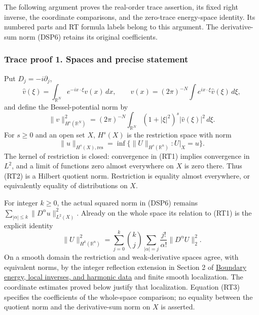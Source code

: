 \documentclass[
  11pt,
]{article}
\makeatletter
\let\ReaderOriginalAnchorStart\hyper@anchorstart
\let\ReaderOriginalAnchorEnd\hyper@anchorend
\let\ReaderPendingAliases\@empty
\def\ReaderArmAliases#1{\gdef\ReaderPendingAliases{#1}}
\def\hyper@anchorstart#1{\ReaderIfNativeAnchorTF{#1}{\ReaderPendingAliases\global\let\ReaderPendingAliases\@empty}{}\ReaderOriginalAnchorStart{#1}}
\makeatother
\begin{document}
The following argument proves the real-order trace assertion, its fixed
right inverse, the coordinate comparisons, and the zero-trace
energy-space identity. Its numbered parts and RT formula labels belong
to this argument. The derivative-sum norm (DSP6) retains its original
coefficients.

\ReaderArmAliases{\ReaderOriginalAnchorStart{trace-proof-1-spaces-and-precise-statement}\ReaderOriginalAnchorEnd\begingroup\expandafter\def\csname @currentHref\endcsname{trace-proof-1-spaces-and-precise-statement}\label{trace-proof-1-spaces-and-precise-statement}\endgroup\ReaderOriginalAnchorStart{trace-proof-1.-spaces-and-precise-statement}\ReaderOriginalAnchorEnd}
\subsubsection{Trace proof 1. Spaces and precise
statement}\label{trace-proof-1.-spaces-and-precise-statement}

Put \(D_j=-i\partial_j\), \[
 \widehat v(\xi)=\int_{\mathbb R^N}e^{-ix\cdot\xi}v(x)\,dx,
 \qquad
 v(x)=(2\pi)^{-N}\int e^{ix\cdot\xi}\widehat v(\xi)\,d\xi,
\] and define the Bessel-potential norm by \[
 \|v\|_{H^s(\mathbb R^N)}^2
 =(2\pi)^{-N}\int_{\mathbb R^N}(1+|\xi|^2)^s|\widehat v(\xi)|^2\,d\xi.
 \tag{RT1}
\] For \(s\geq0\) and an open set \(X\), \(H^s(X)\) is the restriction
space with norm \[
 \|u\|_{H^s(X),\mathrm{res}}
 =\inf\{\|U\|_{H^s(\mathbb R^n)}:U|_X=u\}.
 \tag{RT2}
\] The kernel of restriction is closed: convergence in (RT1) implies
convergence in \(L^2\), and a limit of functions zero almost everywhere
on \(X\) is zero there. Thus (RT2) is a Hilbert quotient norm.
Restriction is equality almost everywhere, or equivalently equality of
distributions on \(X\).

For integer \(k\geq0\), the actual squared norm in (DSP6) remains
\(\sum_{|\alpha|\leq k}\|D^\alpha u\|_{L^2(X)}^2\). Already on the whole
space its relation to (RT1) is the explicit identity \[
 \|U\|_{H^k(\mathbb R^n)}^2
 =\sum_{j=0}^k\binom{k}{j}
   \sum_{|\alpha|=j}\frac{j!}{\alpha!}\|D^\alpha U\|_2^2.
 \tag{RT3}
\] On a smooth domain the restriction and weak-derivative spaces agree,
with equivalent norms, by the integer reflection extension in Section 2
of \href{second-order-boundary.pdf}{Boundary energy, local inverses, and
harmonic data} and finite smooth localization. The coordinate estimates
proved below justify that localization. Equation (RT3) specifies the
coefficients of the whole-space comparison; no equality between the
quotient norm and the derivative-sum norm on \(X\) is asserted.
\end{document}
